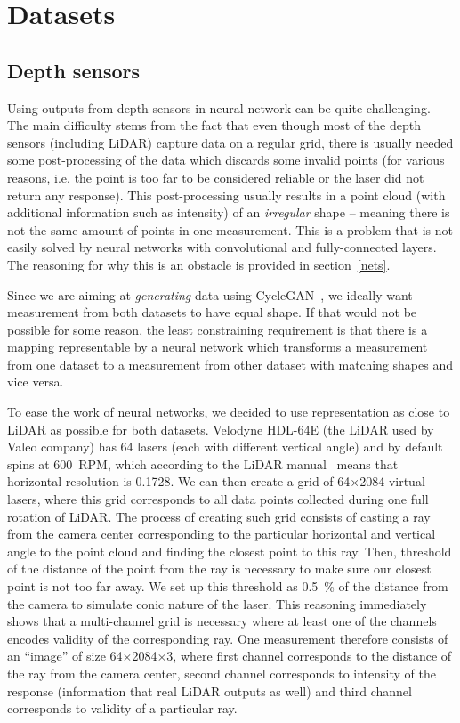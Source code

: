 \chapter{Datasets} \label{dataset}

\section{Depth sensors}
Using outputs from depth sensors in neural network can be quite challenging. The main difficulty stems from the fact that even though most of the depth sensors (including LiDAR) capture data on a regular grid, there is usually needed some post-processing of the data which discards some invalid points (for various reasons, i.e. the point is too far to be considered reliable or the laser did not return any response). This post-processing usually results in a point cloud (with additional information such as intensity) of an {\em irregular} shape -- meaning there is not the same amount of points in one measurement. This is a problem that is not easily solved by neural networks with convolutional and fully-connected layers. The reasoning for why this is an obstacle is provided in section~\ref{nets}.

Since we are aiming at {\em generating} data using CycleGAN~\cite{cyclegan}, we ideally want measurement from both datasets to have equal shape. If that would not be possible for some reason, the least constraining requirement is that there is a mapping representable by a neural network which transforms a measurement from one dataset to a measurement from other dataset with matching shapes and vice versa.

To ease the work of neural networks, we decided to use representation as close to LiDAR as possible for both datasets. Velodyne HDL-64E (the LiDAR used by Valeo company) has 64 lasers (each with different vertical angle) and by default spins at 600~RPM, which according to the LiDAR manual~\cite{velomanual} means that horizontal resolution is 0.1728\degree{}. We can then create a grid of 64$\times$2084 virtual lasers, where this grid corresponds to all data points collected during one full rotation of LiDAR. The process of creating such grid consists of casting a ray from the camera center corresponding to the particular horizontal and vertical angle to the point cloud and finding the closest point to this ray. Then, threshold of the distance of the point from the ray is necessary to make sure our closest point is not too far away. We set up this threshold as 0.5~\% of the distance from the camera to simulate conic nature of the laser. This reasoning immediately shows that a multi-channel grid is necessary where at least one of the channels encodes validity of the corresponding ray. One measurement therefore consists of an ``image'' of size 64$\times$2084$\times$3, where first channel corresponds to the distance of the ray from the camera center, second channel corresponds to intensity of the response (information that real LiDAR outputs as well) and third channel corresponds to validity of a particular ray.

